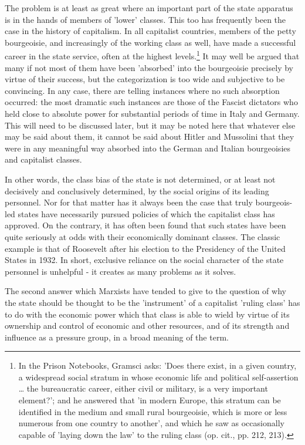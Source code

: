  The problem is at least as great where an important part of the state apparatus is in the hands of members of 'lower' classes. This too has frequently been the case in the history of capitalism. In all capitalist countries, members of the petty bourgeoisie, and increasingly of the working class as well, have made a successful career in the state service, often at the highest levels.\footnote{In the Prison Notebooks, Gramsci asks: 'Does there exist, in a given country, a widespread social stratum in whose economic life and political self-assertion \dots{} the bureaucratic career, either civil or military, is a very important element?'; and he answered that 'in modern Europe, this stratum can be identified in the medium and small rural bourgeoisie, which is more or less numerous from one country to another', and which he saw as occasionally capable of 'laying down the law' to the ruling class (op. cit., pp. 212, 213).} It may well be argued that many if not most of them have been 'absorbed' into the bourgeoisie precisely by virtue of their success, but the categorization is too wide and subjective to be convincing. In any case, there are telling instances where no such absorption occurred: the most dramatic such instances are those of the Fascist dictators who held close to absolute power for substantial periods of time in Italy and Germany. This will need to be discussed later, but it may be noted here that whatever else may be said about them, it cannot be said about Hitler and Mussolini that they were in any meaningful way absorbed into the German and Italian bourgeoisies and capitalist classes.

In other words, the class bias of the state is not determined, or at least not decisively and conclusively determined, by the social origins of its leading personnel. Nor for that matter has it always been the case that truly bourgeois-led states have necessarily pursued policies of which the capitalist class has approved. On the contrary, it has often been found that such states have been quite seriously at odds with their economically dominant classes. The classic example is that of Roosevelt after his election to the Presidency of the United States in 1932. In short, exclusive reliance on the social character of the state personnel is unhelpful - it creates as many problems as it solves.

The second answer which Marxists have tended to give to the question of why the state should be thought to be the 'instrument' of a capitalist 'ruling class' has to do with the economic power which that class is able to wield by virtue of its ownership and control of economic and other resources, and of its strength and influence as a pressure group, in a broad meaning of the term.

